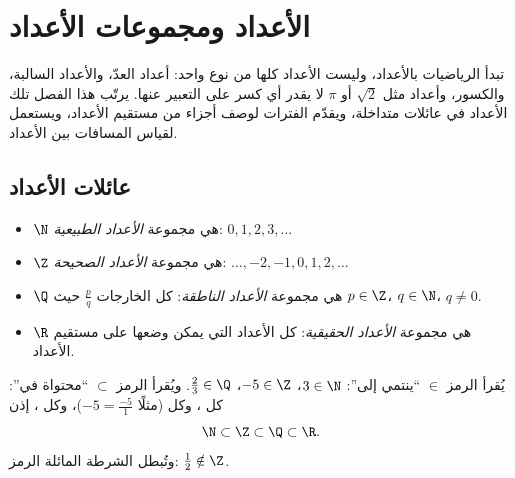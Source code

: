 \chapter{الأعداد ومجموعات الأعداد}\label{ch:g10:numbers}

تبدأ الرياضيات بالأعداد، وليست الأعداد كلها من نوع واحد: أعداد العدّ،
والأعداد السالبة، والكسور، وأعداد مثل $\sqrt 2$ أو $\pi$ لا يقدر أي كسر
على التعبير عنها. يرتّب هذا الفصل تلك الأعداد في عائلات متداخلة، ويقدّم
الفترات لوصف أجزاء من مستقيم الأعداد، ويستعمل  لقياس
المسافات بين الأعداد.

\section{عائلات الأعداد}

\begin{definition}\label{def:g10:numbers:sets}
\begin{itemize}
  \item $\N$ هي مجموعة \emph{الأعداد الطبيعية}:
        $0, 1, 2, 3, \dots$
  \item $\Z$ هي مجموعة \emph{الأعداد الصحيحة}: $\dots, -2, -1,
        0, 1, 2, \dots$
  \item $\Q$ هي مجموعة \emph{الأعداد الناطقة}:
        كل الخارجات $\frac{p}{q}$ حيث $p \in \Z$، $q \in \N$،
        $q \neq 0$.
  \item $\R$ هي مجموعة \emph{الأعداد الحقيقية}: كل
        الأعداد التي يمكن وضعها على مستقيم الأعداد.
\end{itemize}
\end{definition}

\begin{notation}
يُقرأ الرمز $\in$ ``ينتمي إلى'': $3 \in \N$، $-5 \in \Z$،
$\frac23 \in \Q$. ويُقرأ الرمز $\subset$ ``محتواة في'': كل
 ، وكل  
(مثلًا $-5 = \frac{-5}{1}$)، وكل  ، إذن
\[
\N \subset \Z \subset \Q \subset \R .
\]
وتُبطل الشرطة المائلة الرمز: $\frac12 \notin \Z$.
\end{notation}

